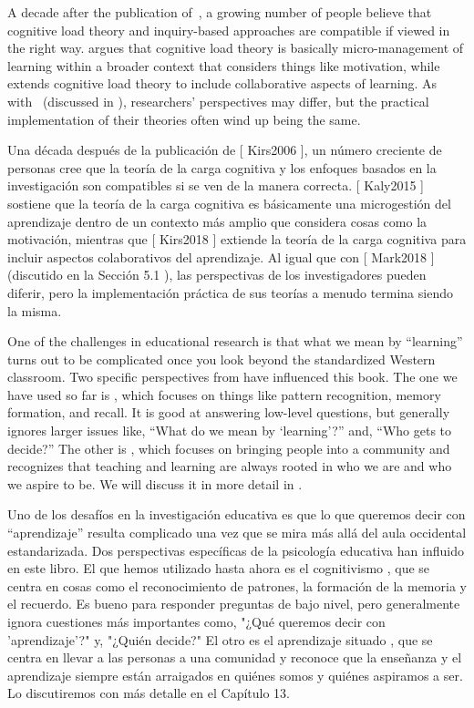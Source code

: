 A decade after the publication of~\cite{Kirs2006},
a growing number of people believe that cognitive load theory and inquiry-based approaches are compatible
if viewed in the right way.
\cite{Kaly2015} argues that cognitive load theory is basically micro-management of learning
within a broader context that considers things like motivation,
while~\cite{Kirs2018} extends cognitive load theory to include collaborative aspects of learning.
As with~\cite{Mark2018} (discussed in ),
researchers' perspectives may differ,
but the practical implementation of their theories often wind up being the same.

Una década después de la publicación de [ Kirs2006 ], un número creciente de personas cree que la teoría de la carga cognitiva y los enfoques basados ​​en la investigación son compatibles si se ven de la manera correcta. [ Kaly2015 ] sostiene que la teoría de la carga cognitiva es básicamente una microgestión del aprendizaje dentro de un contexto más amplio que considera cosas como la motivación, mientras que [ Kirs2018 ] extiende la teoría de la carga cognitiva para incluir aspectos colaborativos del aprendizaje. Al igual que con [ Mark2018 ] (discutido en la Sección  5.1 ), las perspectivas de los investigadores pueden diferir, pero la implementación práctica de sus teorías a menudo termina siendo la misma.

One of the challenges in educational research is that
what we mean by ``learning'' turns out to be complicated
once you look beyond the standardized Western classroom.
Two specific perspectives from  have influenced this book.
The one we have used so far is ,
which focuses on things like pattern recognition, memory formation, and recall.
It is good at answering low-level questions,
but generally ignores larger issues like,
``What do we mean by `learning'?''
and, ``Who gets to decide?''
The other is ,
which focuses on bringing people into a community
and recognizes that
teaching and learning are always rooted in who we are and who we aspire to be.
We will discuss it in more detail in .

Uno de los desafíos en la investigación educativa es que lo que queremos decir con “aprendizaje” resulta complicado una vez que se mira más allá del aula occidental estandarizada. Dos perspectivas específicas de la psicología educativa han influido en este libro. El que hemos utilizado hasta ahora es el cognitivismo , que se centra en cosas como el reconocimiento de patrones, la formación de la memoria y el recuerdo. Es bueno para responder preguntas de bajo nivel, pero generalmente ignora cuestiones más importantes como, "¿Qué queremos decir con 'aprendizaje'?" y, "¿Quién decide?" El otro es el aprendizaje situado , que se centra en llevar a las personas a una comunidad y reconoce que la enseñanza y el aprendizaje siempre están arraigados en quiénes somos y quiénes aspiramos a ser. Lo discutiremos con más detalle en el Capítulo  13.


